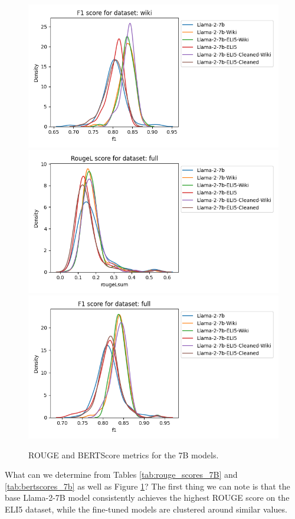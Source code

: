\documentclass[11pt, oneside]{article}   	%
\begin{document}
\begin{figure}
\includegraphics[scale=.5]{./figures/bertscore_F1_7B_wiki}
\includegraphics[scale=.5]{./figures/rougelsum_7B_full}
\includegraphics[scale=.5]{./figures/bertscore_F1_7B_full}
\caption{ROUGE and BERTScore metrics for the 7B models.}
\label{fig:rouge_bertscore_7B}
\end{figure}
What can we determine from Tables \ref{tab:rouge_scores_7B} and \ref{tab:bertscores_7b} as well as Figure \ref{fig:rouge_bertscore_7B}? The first thing we can note is that the base Llama-2-7B model consistently achieves the highest ROUGE score on the ELI5 dataset, while the fine-tuned models are clustered around similar values.
\end{document}
